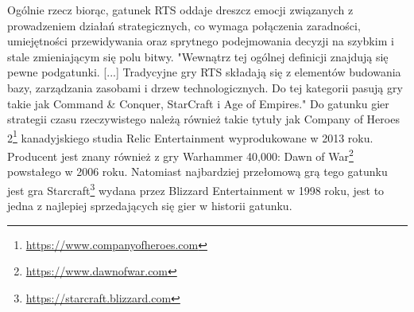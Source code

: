 Ogólnie rzecz biorąc, gatunek RTS oddaje dreszcz emocji związanych z prowadzeniem działań strategicznych, co wymaga połączenia zaradności,
umiejętności przewidywania oraz sprytnego podejmowania decyzji na szybkim i stale zmieniającym się polu bitwy.
"Wewnątrz tej ogólnej definicji znajdują się pewne podgatunki. [...] Tradycyjne gry RTS składają się z elementów budowania bazy, zarządzania zasobami i drzew technologicznych. Do tej kategorii pasują gry takie jak Command \& Conquer, StarCraft i Age of Empires."\cite{stateoftherts}
Do gatunku gier strategii czasu rzeczywistego należą również takie tytuły jak Company of Heroes 2\footnote{\url{https://www.companyofheroes.com}} kanadyjskiego studia 
Relic Entertainment wyprodukowane w 2013 roku. Producent jest znany również z gry Warhammer 40,000: Dawn of War\footnote{\url{https://www.dawnofwar.com}} powstałego w 2006 roku.
Natomiast najbardziej przełomową grą tego gatunku jest gra Starcraft\footnote{\url{https://starcraft.blizzard.com}} wydana przez Blizzard Entertainment w 1998 roku, jest to jedna z najlepiej sprzedających się gier w historii gatunku\cite{rtslist}.
